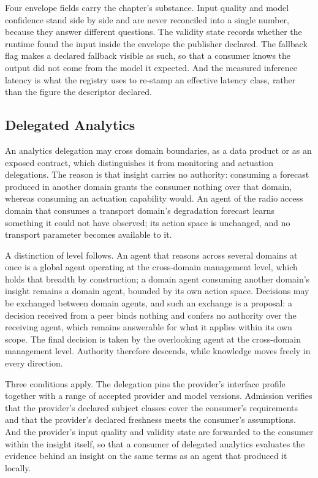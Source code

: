 Four envelope fields carry the chapter's substance. Input quality and
model confidence stand side by side and are never reconciled into a
single number, because they answer different questions. The validity
state records whether the runtime found the input inside the envelope
the publisher declared. The fallback flag makes a declared fallback
visible as such, so that a consumer knows the output did not come from
the model it expected. And the measured inference latency is what the
registry uses to re-stamp an effective latency class, rather than the
figure the descriptor declared.

\hypertarget{delegated-analytics}{%
\subsection{Delegated Analytics}\label{delegated-analytics}}

An analytics delegation may cross domain boundaries, as a data product
or as an exposed contract, which distinguishes it from monitoring and
actuation delegations. The reason is that insight carries no authority:
consuming a forecast produced in another domain grants the consumer
nothing over that domain, whereas consuming an actuation capability
would. An agent of the radio access domain that consumes a transport
domain's degradation forecast learns something it could not have
observed; its action space is unchanged, and no transport parameter
becomes available to it.

A distinction of level follows. An agent that reasons across several
domains at once is a global agent operating at the cross-domain
management level, which holds that breadth by construction; a domain
agent consuming another domain's insight remains a domain agent, bounded
by its own action space. Decisions may be exchanged between domain
agents, and such an exchange is a proposal: a decision received from a
peer binds nothing and confers no authority over the receiving agent,
which remains answerable for what it applies within its own scope. The
final decision is taken by the overlooking agent at the cross-domain
management level. Authority therefore descends, while knowledge moves
freely in every direction.

Three conditions apply. The delegation pins the provider's interface
profile together with a range of accepted provider and model versions.
Admission verifies that the provider's declared subject classes cover
the consumer's requirements and that the provider's declared freshness
meets the consumer's assumptions. And the provider's input quality and
validity state are forwarded to the consumer within the insight itself,
so that a consumer of delegated analytics evaluates the evidence behind
an insight on the same terms as an agent that produced it locally.

